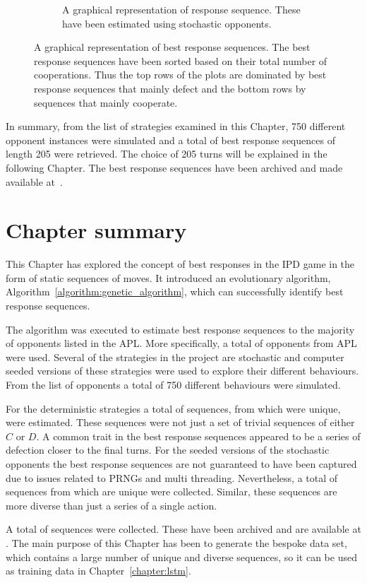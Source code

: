\begin{figure}[!htbp]
\begin{subfigure}{0.45\textwidth}
    \caption{A graphical representation of \stochasticsequences response sequence. These
    have been estimated using stochastic opponents.}\label{fig:brs_visualisation_stochastic}
    \end{subfigure}
    \caption{A graphical representation of best response sequences. The best
    response sequences have been sorted based on their total number of
    cooperations. Thus the top rows of the plots are dominated by best response
    sequences that mainly defect and the bottom rows by sequences that mainly
    cooperate.}
\end{figure}

In summary, from the list of \numberofstrategiesbestsequences strategies
examined in this Chapter, 750 different opponent instances were simulated and a
total of \totalsequences best response sequences of length 205 were retrieved. The choice of
205 turns will be explained in the following Chapter. The best response sequences have
been archived and made available at~\cite{Glynatsi2020_sequences}.

\section{Chapter summary}

This Chapter has explored the concept of best responses in the IPD game in the
form of static sequences of moves. It introduced an evolutionary algorithm,
Algorithm~\ref{algorithm:genetic_algorithm}, which can successfully identify
best response sequences.

The algorithm was executed to estimate best response sequences to the majority
of opponents listed in the APL. More specifically, a total of
\numberofstrategiesbestsequences opponents from APL were used. Several of the
strategies in the project are stochastic and computer seeded versions of these
strategies were used to explore their different behaviours. From the list of
\numberofstrategiesbestsequences opponents a total of 750 different behaviours
were simulated.

For the \deterministicstrategies deterministic strategies a total of
\deterministicsequences sequences, from which \deterministicuniquesequences were
unique, were estimated. These sequences were not just a set of trivial sequences
of either \(C\) or \(D\). A common trait in the best response sequences appeared
to be a series of defection closer to the final turns. For the seeded versions
of the \stochasticstrategies stochastic opponents the best response sequences
are not guaranteed to have been captured due to issues related to PRNGs and
multi threading. Nevertheless, a total of \stochasticsequences sequences from
which \stochasticuniquesequences are unique were collected. Similar, these
sequences are more diverse than just a series of a single action.

A total of \totalsequences sequences were collected. These have been archived
and are available at \cite{Glynatsi2020_sequences}. The main purpose of this
Chapter has been to generate the bespoke data set, which contains a large number
of unique and diverse sequences, so it can be used as training data in
Chapter~\ref{chapter:lstm}.

